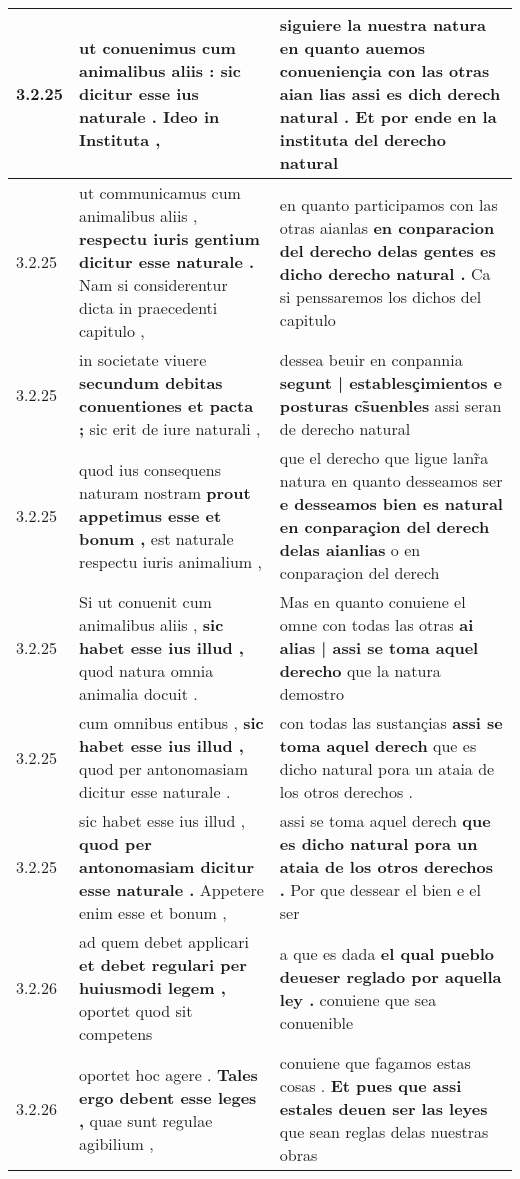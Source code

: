 \begin{tabular}{|p{1cm}|p{6.5cm}|p{6.5cm}|}
3.2.25 & ut conuenimus cum animalibus aliis : \textbf{ sic dicitur esse ius naturale . } Ideo in Instituta , & siguiere la nuestra natura en quanto auemos conueniençia con las otras aian lias \textbf{ assi es dich derech natural . } Et por ende en la instituta del derecho natural \\\hline
3.2.25 & ut communicamus cum animalibus aliis , \textbf{ respectu iuris gentium dicitur esse naturale . } Nam si considerentur dicta in praecedenti capitulo , & en quanto participamos con las otras aianlas \textbf{ en conparacion del derecho delas gentes es dicho derecho natural . } Ca si penssaremos los dichos del capitulo \\\hline
3.2.25 & in societate viuere \textbf{ secundum debitas conuentiones et pacta ; } sic erit de iure naturali , & dessea beuir en conpannia \textbf{ segunt | establesçimientos e posturas cs̃uenbles } assi seran de derecho natural \\\hline
3.2.25 & quod ius consequens naturam nostram \textbf{ prout appetimus esse et bonum , } est naturale respectu iuris animalium , & que el derecho que ligue lanr̃a natura en quanto desseamos ser \textbf{ e desseamos bien es natural en conparaçion del derech delas aianlias } o en conparaçion del derech \\\hline
3.2.25 & Si ut conuenit cum animalibus aliis , \textbf{ sic habet esse ius illud , } quod natura omnia animalia docuit . & Mas en quanto conuiene el omne con todas las otras \textbf{ ai alias | assi se toma aquel derecho } que la natura demostro \\\hline
3.2.25 & cum omnibus entibus , \textbf{ sic habet esse ius illud , } quod per antonomasiam dicitur esse naturale . & con todas las sustançias \textbf{ assi se toma aquel derech } que es dicho natural pora un ataia de los otros derechos . \\\hline
3.2.25 & sic habet esse ius illud , \textbf{ quod per antonomasiam dicitur esse naturale . } Appetere enim esse et bonum , & assi se toma aquel derech \textbf{ que es dicho natural pora un ataia de los otros derechos . } Por que dessear el bien e el ser \\\hline
3.2.26 & ad quem debet applicari \textbf{ et debet regulari per huiusmodi legem , } oportet quod sit competens & a que es dada \textbf{ el qual pueblo deueser reglado por aquella ley . } conuiene que sea conuenible \\\hline
3.2.26 & oportet hoc agere . \textbf{ Tales ergo debent esse leges , } quae sunt regulae agibilium , & conuiene que fagamos estas cosas . \textbf{ Et pues que assi estales deuen ser las leyes } que sean reglas delas nuestras obras \\\hline

\end{tabular}
